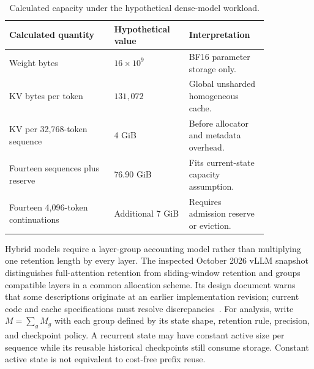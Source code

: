 \begin{table}[!htbp]
\centering
\caption{Calculated capacity under the hypothetical dense-model workload.}\label{tab:C31:capacity}
\begin{tabular}{L{0.35\linewidth}L{0.25\linewidth}L{0.24\linewidth}}

\toprule Calculated quantity & Hypothetical value & Interpretation\\\midrule
Weight bytes & $16\times10^9$ & BF16 parameter storage only.\\
KV bytes per token & $131{,}072$ & Global unsharded homogeneous cache.\\
KV per 32,768-token sequence & 4 GiB & Before allocator and metadata overhead.\\
Fourteen sequences plus reserve & 76.90 GiB & Fits current-state capacity assumption.\\
Fourteen 4,096-token continuations & Additional 7 GiB & Requires admission reserve or eviction.\\
\bottomrule
\end{tabular}
\end{table}

Hybrid models require a layer-group accounting model rather than multiplying one retention length by every layer. The inspected October 2026 vLLM snapshot distinguishes full-attention retention from sliding-window retention and groups compatible layers in a common allocation scheme. Its design document warns that some descriptions originate at an earlier implementation revision; current code and cache specifications must resolve discrepancies~\cite{repo_vllm}. For analysis, write $M=\sum_g M_g$ with each group defined by its state shape, retention rule, precision, and checkpoint policy. A recurrent state may have constant active size per sequence while its reusable historical checkpoints still consume storage. Constant active state is not equivalent to cost-free prefix reuse.


